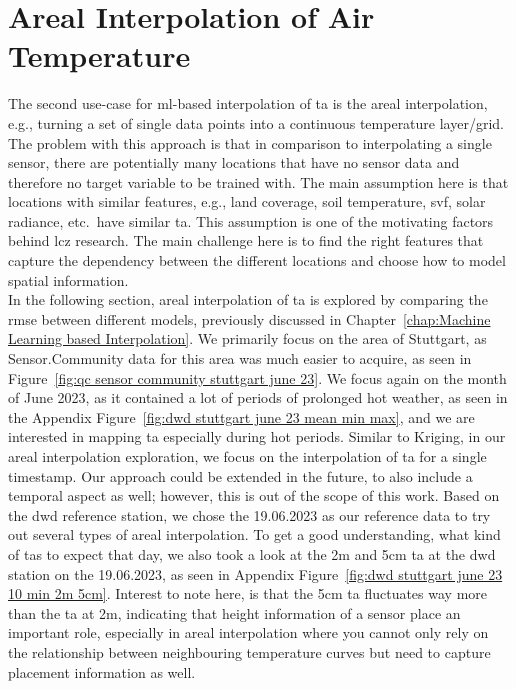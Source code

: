 \section{Areal Interpolation of Air Temperature}

The second use-case for \gls{ml}-based interpolation of \gls{ta} is the areal interpolation, e.g., turning a set of single data points into a continuous temperature layer/grid. The problem with this approach is that in comparison to interpolating a single sensor, there are potentially many locations that have no sensor data and therefore no target variable to be trained with. The main assumption here is that locations with similar features, e.g., land coverage, soil temperature, \gls{svf}, solar radiance, etc.\ have similar \gls{ta}. This assumption is one of the motivating factors behind \gls{lcz} research. The main challenge here is to find the right features that capture the dependency between the different locations and choose how to model spatial information.\\
In the following section, areal interpolation of \gls{ta} is explored by comparing the \gls{rmse} between different models, previously discussed in Chapter~\ref{chap:Machine Learning based Interpolation}. We primarily focus on the area of Stuttgart, as Sensor.Community data for this area was much easier to acquire, as seen in Figure~\ref{fig:qc sensor community stuttgart june 23}. We focus again on the month of June 2023, as it contained a lot of periods of prolonged hot weather, as seen in the Appendix Figure~\ref{fig:dwd stuttgart june 23 mean min max}, and we are interested in mapping \gls{ta} especially during hot periods. Similar to Kriging, in our areal interpolation exploration, we focus on the interpolation of \gls{ta} for a single timestamp. Our approach could be extended in the future, to also include a temporal aspect as well; however, this is out of the scope of this work. Based on the \gls{dwd} reference station, we chose the 19.06.2023 as our reference data to try out several types of areal interpolation. To get a good understanding, what kind of \gls{ta}s to expect that day, we also took a look at the 2m and 5cm \gls{ta} at the \gls{dwd} station on the 19.06.2023, as seen in Appendix Figure~\ref{fig:dwd stuttgart june 23 10 min 2m 5cm}. Interest to note here, is that the 5cm \gls{ta} fluctuates way more than the \gls{ta} at 2m, indicating that height information of a sensor place an important role, especially in areal interpolation where you cannot only rely on the relationship between neighbouring temperature curves but need to capture placement information as well.\\

